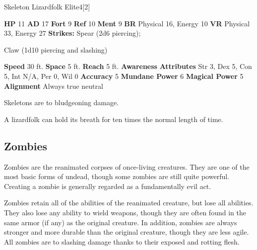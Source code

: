   \begin{monsubsection}{Skeleton Lizardfolk Elite}{4}[2]
    \vspace{-1em}\vspace{-1em}
    \vspace{0em}

    
    

    \begin{spellcontent}
      \begin{spelltargetinginfo}
        \pari \textbf{HP} 11 \monsep
          \textbf{AD} 17 \monsep
          \textbf{Fort} 9 \monsep
          \textbf{Ref} 10 \monsep
          \textbf{Ment} 9
        \pari \textbf{BR} Physical 16, Energy 10 \monsep
        \textbf{VR} Physical 33, Energy 27
        \pari \textbf{Strikes:}
            Spear  (2d6 piercing);
\par Claw  (1d10 piercing and slashing)
      \end{spelltargetinginfo}
    \end{spellcontent}
    \begin{monsterfooter}
      \pari \textbf{Speed} 30 ft. \monsep
        \textbf{Space} 5 ft. \monsep
        \textbf{Reach} 5 ft.
      \pari \textbf{Awareness} 
      \pari \textbf{Attributes}
        Str 3, Dex 5,
        Con 5, Int N/A,
        Per 0, Wil 0
      \pari \textbf{Accuracy} 5 \monsep
        \textbf{Mundane Power} 6 \monsep
      \textbf{Magical Power} 5
      \pari \textbf{Alignment} Always true neutral
    \end{monsterfooter}
  \end{monsubsection}
          Skeletons are  to bludgeoning damage.
        
     A lizardfolk can hold its breath for ten times the normal length of time.
  
  
    \subsection{Zombies}
      
      Zombies are the reanimated corpses of once-living creatures.
      They are one of the most basic forms of undead, though some zombies are still quite powerful.
      Creating a zombie is generally regarded as a fundamentally evil act.
    
      Zombies retain all of the  abilities of the reanimated creature, but lose all  abilities.
      They also lose any ability to wield weapons, though they are often found in the same armor (if any) as the original creature.
      In addition, zombies are always stronger and more durable than the original creature, though they are less agile.
      All zombies are  to slashing damage thanks to their exposed and rotting flesh.
    
